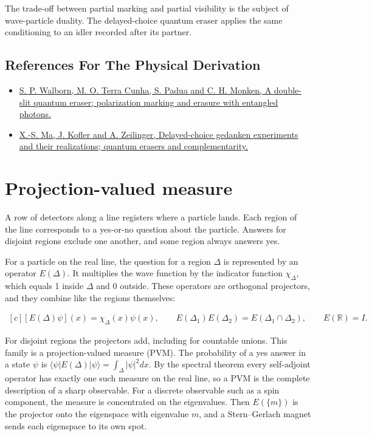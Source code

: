 \documentclass[11pt,oneside]{book}
\newenvironment{centeredalign}{\[\begin{gathered}[c]}{\end{gathered}\]}
\begin{document}
The trade-off between partial marking and partial visibility is the subject of wave-particle duality. The delayed-choice quantum eraser applies the same conditioning to an idler recorded after its partner.

\subsection*{References For The Physical Derivation}
\begin{itemize}
\item \href{https://arxiv.org/abs/quant-ph/0106078}{S. P. Walborn, M. O. Terra Cunha, S. Padua and C. H. Monken, A double-slit quantum eraser; polarization marking and erasure with entangled photons.}
\item \href{https://arxiv.org/abs/1407.2930}{X.-S. Ma, J. Kofler and A. Zeilinger, Delayed-choice gedanken experiments and their realizations; quantum erasers and complementarity.}
\end{itemize}





\clearpage

\section{Projection-valued measure}

\label{topic:projection-valued-measure}

A row of detectors along a line registers where a particle lands. Each region of the line corresponds to a yes-or-no question about the particle. Answers for disjoint regions exclude one another, and some region always answers yes.

For a particle on the real line, the question for a region \(\Delta\) is represented by an operator \(E(\Delta)\). It multiplies the wave function by the indicator function \(\chi_\Delta\), which equals 1 inside \(\Delta\) and 0 outside. These operators are orthogonal projectors, and they combine like the regions themselves:

\begin{centeredalign}
[E(\Delta)\psi](x)=\chi_\Delta(x)\psi(x),\qquad
E(\Delta_1)E(\Delta_2)=E(\Delta_1\cap\Delta_2),\qquad E(\mathbb R)=I.
\end{centeredalign}

For disjoint regions the projectors add, including for countable unions. This family is a projection-valued measure (PVM). The probability of a yes answer in a state \(\psi\) is \(\langle\psi|E(\Delta)|\psi\rangle=\int_\Delta|\psi|^2dx\). By the spectral theorem every self-adjoint operator has exactly one such measure on the real line, so a PVM is the complete description of a sharp observable. For a discrete observable such as a spin component, the measure is concentrated on the eigenvalues. Then \(E(\{m\})\) is the projector onto the eigenspace with eigenvalue \(m\), and a Stern--Gerlach magnet sends each eigenspace to its own spot.
\end{document}
